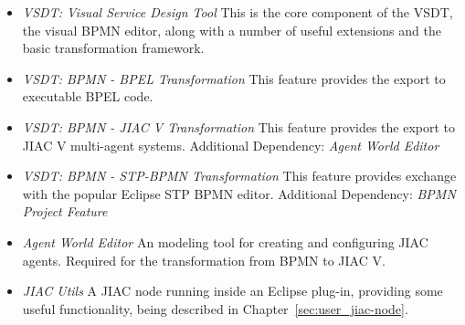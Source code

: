 \begin{itemize}
	\item \emph{VSDT: Visual Service Design Tool} This is the core component of
	the VSDT, the visual BPMN editor, along with a number of useful extensions
	and the basic transformation framework.



	\item \emph{VSDT: BPMN - BPEL Transformation} This feature provides the export
	to executable BPEL code.

	\item \emph{VSDT: BPMN - JIAC V Transformation} This feature provides the
	export to JIAC V multi-agent systems.  Additional Dependency: \emph{Agent World
	Editor}

	\item \emph{VSDT: BPMN - STP-BPMN Transformation} This feature provides
	exchange with the popular Eclipse STP BPMN editor.  Additional Dependency:
	\emph{BPMN Project Feature}

	\item \emph{Agent World Editor} An modeling tool for creating and configuring
	JIAC agents.  Required for the transformation from BPMN to JIAC V.

	\item \emph{JIAC Utils} A JIAC node running inside an Eclipse plug-in,
	providing some useful functionality, being described in
	Chapter~\ref{sec:user_jiac-node}.
\end{itemize}

